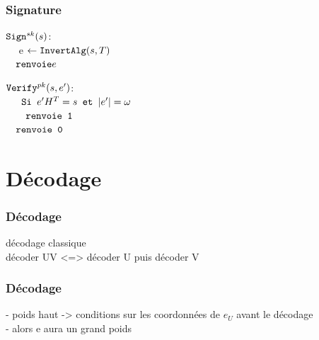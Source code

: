 \documentclass[10pt,a4paper]{beamer}
\theoremstyle{plain}
\theoremstyle{definition}
\begin{document}
\begin{frame}[fragile]
\frametitle{Signature}
\begin{multicols}{2}
\begin{flushleft}
$\verb|Sign|^{sk}(s)$:\\
	$\quad$ e $\leftarrow  \verb|InvertAlg|(s,T)$ \\
	$\quad \verb|renvoie| e$\\
\end{flushleft}
\begin{flushleft}
$\verb|Verify|^{pk}(s,e')$: \\
	$\quad \verb| Si | e'H^T = s \verb| et | |e'| = \omega $ \\
	$\quad \quad \verb|renvoie 1| $\\
	$\quad \verb|renvoie 0|$\\
\end{flushleft}
\end{multicols}
\end{frame}

\section{Décodage}

\begin{frame}
\frametitle{Décodage}
décodage classique\\
décoder UV <=> décoder U puis décoder V\\

\end{frame}

\begin{frame}
\frametitle{Décodage}
- poids haut -> conditions sur les coordonnées de $e_U$ avant le décodage\\
- alors e aura un grand poids
\end{frame}
\end{document}
